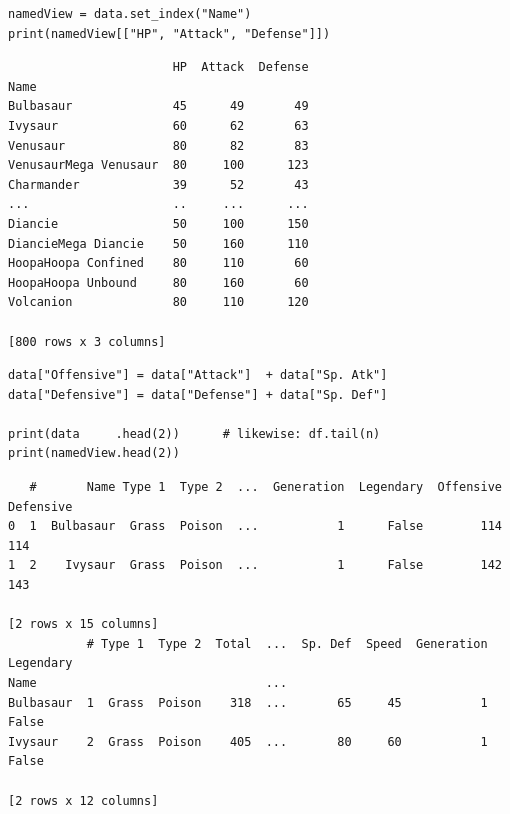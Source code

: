 \begin{frame}[fragile]
%
\begin{codebox}
\begin{verbatim}
namedView = data.set_index("Name")
print(namedView[["HP", "Attack", "Defense"]])
\end{verbatim}
\end{codebox}
%
\begin{cmdbox}
\begin{verbatim}
                       HP  Attack  Defense
Name                                      
Bulbasaur              45      49       49
Ivysaur                60      62       63
Venusaur               80      82       83
VenusaurMega Venusaur  80     100      123
Charmander             39      52       43
...                    ..     ...      ...
Diancie                50     100      150
DiancieMega Diancie    50     160      110
HoopaHoopa Confined    80     110       60
HoopaHoopa Unbound     80     160       60
Volcanion              80     110      120

[800 rows x 3 columns]
\end{verbatim}
\end{cmdbox}
%
\end{frame}


\begin{frame}[fragile]
%
\begin{codebox}
\begin{verbatim}
data["Offensive"] = data["Attack"]  + data["Sp. Atk"]
data["Defensive"] = data["Defense"] + data["Sp. Def"]

print(data     .head(2))      # likewise: df.tail(n)
print(namedView.head(2))
\end{verbatim}
\end{codebox}
%
\begin{cmdbox}
\begin{verbatim}
   #       Name Type 1  Type 2  ...  Generation  Legendary  Offensive  Defensive
0  1  Bulbasaur  Grass  Poison  ...           1      False        114        114
1  2    Ivysaur  Grass  Poison  ...           1      False        142        143

[2 rows x 15 columns]
           # Type 1  Type 2  Total  ...  Sp. Def  Speed  Generation  Legendary
Name                                ...                                       
Bulbasaur  1  Grass  Poison    318  ...       65     45           1      False
Ivysaur    2  Grass  Poison    405  ...       80     60           1      False

[2 rows x 12 columns]
\end{verbatim}
\end{cmdbox}
%
\end{frame}

